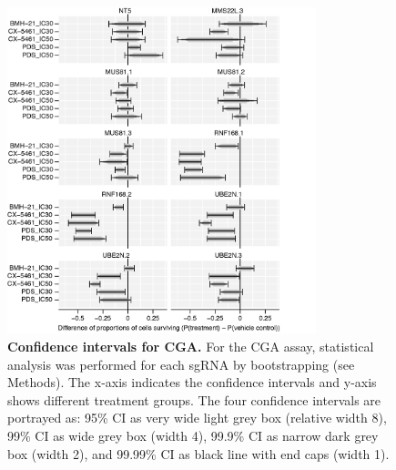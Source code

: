 \clearpage

\begin{figure}
    \centering
    \includegraphics[width=0.8\textwidth]{supplement/figures/validation_bootstrap.png}
    \caption[CGA with confidence intervals]
            {\small{\textbf{Confidence intervals for CGA.}}
            For the CGA assay, statistical analysis was performed for each sgRNA by bootstrapping (see Methods). The x-axis indicates the confidence intervals and y-axis shows different treatment groups. The four confidence intervals are portrayed as: 95\% CI as very wide light grey box (relative width 8), 99\% CI as wide grey box (width 4), 99.9\% CI as narrow dark grey box (width 2), and 99.99\% CI as black line with end caps (width 1).
            }
        \label{sfig:validationCI}
\end{figure}

